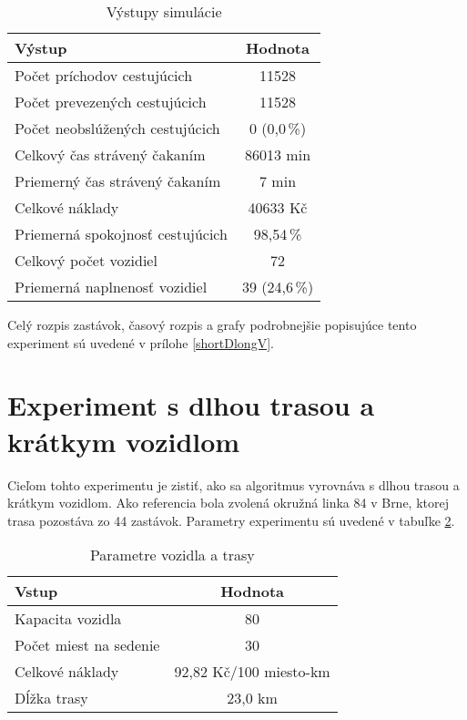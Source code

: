 \begin{table}[h]
  \centering
  \begin{tabular}{|l|c|}
    \hline
      \textbf{Výstup} & \textbf{Hodnota} \\ \hline
      Počet príchodov cestujúcich & 11528 \\ \hline
      Počet prevezených cestujúcich & 11528 \\ \hline
      Počet neobslúžených cestujúcich & 0 (0,0\,\%) \\ \hline
      Celkový čas strávený čakaním & 86013 min \\ \hline
      Priemerný čas strávený čakaním & 7 min \\ \hline
      Celkové náklady & 40633 Kč \\ \hline
      Priemerná spokojnosť cestujúcich & 98,54\,\% \\ \hline
      Celkový počet vozidiel & 72 \\ \hline
      Priemerná naplnenosť vozidiel & 39 (24,6\,\%) \\ \hline
  \end{tabular}
  \caption{Výstupy simulácie}
  \label{tab:shortDlongVout}
\end{table}

Celý rozpis zastávok, časový rozpis a grafy podrobnejšie popisujúce tento experiment sú uvedené v prílohe \ref{shortDlongV}.

\newpage

\section{Experiment s dlhou trasou a krátkym vozidlom}
Cieľom tohto experimentu je zistiť, ako sa algoritmus vyrovnáva s dlhou trasou a krátkym vozidlom.
Ako referencia bola zvolená okružná linka 84 v Brne, ktorej trasa pozostáva zo 44 zastávok.
Parametry experimentu sú uvedené v tabuľke \ref{tab:longDshortVin}.

\begin{table}[h]
  \centering
  \begin{tabular}{|l|c|}
    \hline
    \textbf{Vstup} & \textbf{Hodnota} \\ \hline
    Kapacita vozidla & 80 \\ \hline
    Počet miest na sedenie & 30 \\ \hline
    Celkové náklady & 92,82 Kč/100 miesto-km \\ \hline
    Dĺžka trasy & 23,0 km \\ \hline
  \end{tabular}
  \caption{Parametre vozidla a trasy}
  \label{tab:longDshortVin}
\end{table}

